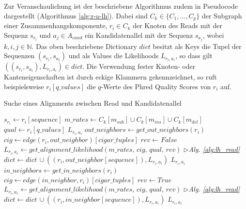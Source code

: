 Zur Veranschaulichung ist der beschriebene Algorithmus zudem in Pseudocode dargestellt (Algorithmus \ref{alg:r-a-lh}). Dabei sind $ C_{k} \in \{C_{1}, \dots ,C_{p}\} $ der Subgraph einer Zusammenhangskomponente, $ r_{i} \in C_{k} $ der Knoten des Reads mit der Sequenz $s_{r_{i}}$ und $ a_{j} \in A_{cand} $ ein Kandidatenallel mit der Sequenz $ s_{a_{j}} $, wobei $ k,i,j \in \mathds{N} $. Das oben beschriebene Dictionary $dict$ besitzt als Keys die Tupel der Sequenzen $(s_{r_{i}}, s_{a_{i}}) $ und als Values die Likelihoods $L_{r_{i}, a_{i}}$, so dass gilt $ ((s_{r_{i}}, s_{a_{i}}), L_{r_{i}, a_{i}})  \in dict $. Die Verwendung fester Knoten- oder Kanteneigenschaften ist durch eckige Klammern gekennzeichnet, so ruft beispielsweise $r_{i}[q\_values]$ die $ q $-Werte des Phred Quality Scores von $r_{i}$ auf.\\

\renewcommand{\algorithmiccomment}[1]{\hfill$\triangleright$\textit{#1}}
\begin{algorithm}[H]
	\caption{Suche eines Alignments zwischen Read und Kandidatenallel} \label{alg:r-a-lh}
	\begin{algorithmic}[1]	
		\State $ s_{r_{i}} \gets r_{i}[sequence]$
		\State $ m\_{rates} \gets C_{k}[m_{sub}] \cup C_{k}[m_{ins}] \cup C_{k}[m_{del}] $
		\State $ qual \gets r_{i}[q\_values] $
		\State \Return $ L_{r_{i}, a_{i}} $
		\EndIf		
		\State $ out\_neighbors \gets get\_out\_neighbors(r_{i})$
		\State $ cig \gets edge(r_{i}, out\_neighbor)[cigar\_tuples]$		
		\State $ rev \gets False $
		\State $ L_{r_{i}, a_{i}} \gets get\_alignment\_likelihood(m\_{rates},\, cig,\, qual,\, rev)$
		\algorithmiccomment{Alg. \ref{alg:lh_read}}
		\State $ dict \gets dict \, \cup ((r_{i}, out\_neighbor[sequence]), L_{r_{i}, a_{i}})  $
		\State \Return $L_{r_{i}, a_{i}}$   
		\EndIf
		\EndFor		
		\State $ in\_neighbors \gets get\_in\_neighbors(r_{i})$		
		\State $ cig \gets edge(in\_neighbor, r_{i})[cigar\_tuples]$		
		\State $ rev \gets True $
		\State $ L_{r_{i}, a_{i}} \gets get\_alignment\_likelihood(m\_{rates},\, cig,\, qual,\, rev)$
		\algorithmiccomment{Alg. \ref{alg:lh_read}}
		\State $ dict \gets dict \, \cup ((r_{i}, in\_neighbor[sequence]), L_{r_{i}, a_{i}})  $
		\State \Return $L_{r_{i}, a_{i}}$  
		\EndIf		
		\EndFor		
		\State {}
		\EndFunction
	\end{algorithmic}
\end{algorithm}

